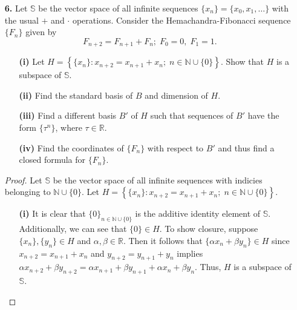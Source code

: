 \documentclass[ 12pt ]{article}
\begin{document}
\begin{enumerate}
	\item[\textbf{6.}] Let $\mathbb{S}$ be the vector space of all infinite sequences $\{ x_n \} = \{ x_0, x_1, \hdots \}$ with the usual $+$ and $\cdot$ operations. Consider the
		Hemachandra-Fibonacci sequence $\{ F_n \}$ given by $$F_{n+2} = F_{n+1} + F_n;\; F_0 = 0,\; F_1 = 1.$$
		\begin{enumerate}
			\item[\textbf{(i)}] Let $H = \left \{ \{ x_n \} : x_{n+2} = x_{n+1} + x_n;\; n \in \mathbb{N} \cup \{ 0 \} \right \}$. Show that $H$ is a subspace of $\mathbb{S}$.
			\item[\textbf{(ii)}] Find the standard basis of $B$ and dimension of $H$.
			\item[\textbf{(iii)}] Find a different basis $B'$ of $H$ such that sequences of $B'$ have the form $\{ \tau^n \}$, where $\tau \in \mathbb{R}$.
			\item[\textbf{(iv)}] Find the coordinates of $\{ F_n \}$ with respect to $B'$ and thus find a closed formula for $\{ F_n \}$.
		\end{enumerate}

		\begin{proof}
			Let $\mathbb{S}$ be the vector space of all infinite sequences with indicies belonging to $\mathbb{N} \cup \{ 0 \}$. Let $H = \left \{ \{ x_n \} : x_{n+2} = x_{n+1} +
			x_n;\; n \in \mathbb{N} \cup \{ 0 \} \right \}$.
			\begin{enumerate}
				\item[\textbf{(i)}]  It is clear that $\{ 0 \}_{n \in \mathbb{N} \cup \{ 0 \} }$ is the additive identity element of $\mathbb{S}$. Additionally, we can see that
					$\{ 0 \} \in H$. To show closure, suppose $\{ x_n \}, \{ y_n \} \in H$ and $\alpha, \beta \in \mathbb{R}$. Then it follows that $\{ \alpha x_n + \beta y_n \} \in H$
					since $x_{n+2} = x_{n+1} + x_n$ and $y_{n+2} = y_{n+1} + y_n$ implies $\alpha x_{n+2} + \beta y_{n+2} = \alpha x_{n+1} + \beta y_{n+1} + \alpha x_n + \beta y_n$.
					Thus, $H$ is a subspace of $\mathbb{S}$.


\end{enumerate}
\end{proof}
\end{enumerate}
\end{document}
